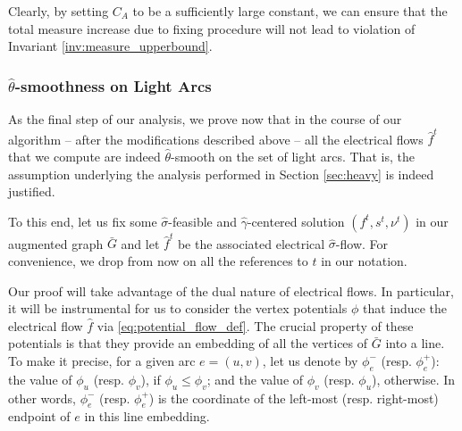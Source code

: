 \documentclass[11pt, letterpaper]{article}
\newcommand{\cauxiliary}{C_{A}}
\newcommand{\oG}{\bar{G}}
\newcommand{\hgamma}{\hat{\gamma}}
\newcommand{\htheta}{\hat{\theta}}
\newcommand{\vphi}{\boldsymbol{\mathit{\phi}}}
\newcommand{\vnu}{\boldsymbol{\mathit{\nu}}}
\newcommand{\hvsigma}{\boldsymbol{\mathit{\hat{\sigma}}}}
\newcommand{\ff}{\boldsymbol{\mathit{f}}}
\newcommand{\hff}{\boldsymbol{\mathit{\hat{f}}}}
\renewcommand{\ss}{\boldsymbol{\mathit{s}}}
\begin{document}
Clearly, by setting $\cauxiliary$ to be a sufficiently large constant, we can ensure that the total measure increase due to fixing procedure will not lead to violation of Invariant \ref{inv:measure_upperbound}.

\subsubsection*{$\htheta$-smoothness on Light Arcs}\label{sec:smoothness}

As the final step of our analysis, we prove now that in the course of our algorithm -- after the modifications described above -- all the electrical flows $\hff^t$ that we compute are indeed $\htheta$-smooth on the set of light arcs. That is, the assumption underlying the analysis performed in Section \ref{sec:heavy} is indeed justified.

To this end, let us fix some $\hvsigma$-feasible and $\hgamma$-centered solution $(\ff^t,\ss^t,\vnu^t)$ in our augmented graph $\oG$ and let $\hff^t$ be the associated electrical $\hvsigma$-flow. For convenience, we drop from now on all the references to $t$ in our notation. 

Our proof will take advantage of the dual nature of electrical flows. In particular, it will be instrumental for us to consider the vertex potentials $\vphi$ that induce the electrical flow $\hff$ via \eqref{eq:potential_flow_def}. The crucial property of these potentials is that they provide an embedding of all the vertices of $\oG$ into a line. To make it precise, for a given arc $e=(u,v)$, let us denote by $\phi_e^-$ (resp. $\phi_e^+$): the value of $\phi_u$ (resp. $\phi_v$), if $\phi_u\leq \phi_v$; and the value of $\phi_v$ (resp. $\phi_u$), otherwise. In other words, $\phi^-_e$ (resp. $\phi_e^+$) is the coordinate of the left-most (resp. right-most) endpoint of $e$ in this line embedding. 
\end{document}
